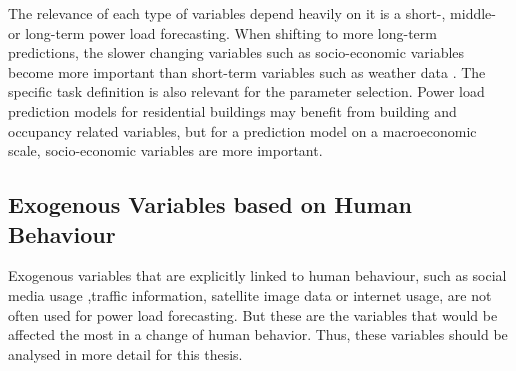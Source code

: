 The relevance of each type of variables depend heavily on it is
a short-, middle- or long-term power load forecasting. When shifting to more 
long-term predictions, the slower changing variables such as socio-economic
variables become more important than short-term variables such as weather data 
\cite{loadforecastingtimedependency2}\cite{loadforecastingtimedependency}.
The specific task definition is also relevant for the parameter selection.
Power load prediction models for residential buildings may benefit from 
building and occupancy related variables, but for a prediction model on a 
macroeconomic scale, socio-economic variables are more important.

\subsection{Exogenous Variables based on Human Behaviour}

Exogenous variables that are explicitly linked to human behaviour, 
such as social media usage ,traffic information, 
satellite image data or internet usage, are not often 
used for power load forecasting. 
But these are the variables that would be affected the most in a change of 
human behavior. Thus, these variables should be analysed in more detail 
for this thesis.


